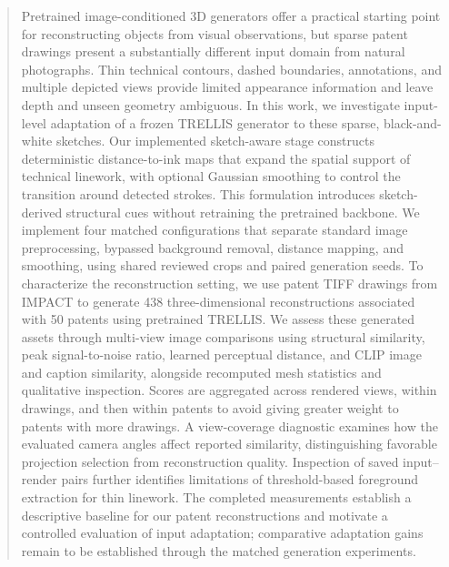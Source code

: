 \begin{abstract}
Pretrained image-conditioned 3D generators offer a practical starting point for
reconstructing objects from visual observations, but sparse patent drawings
present a substantially different input domain from natural photographs.
Thin technical contours, dashed boundaries, annotations, and multiple depicted
views provide limited appearance information and leave depth and unseen
geometry ambiguous. In this work, we investigate input-level adaptation of a
frozen TRELLIS generator to these sparse, black-and-white sketches. Our
implemented sketch-aware stage constructs deterministic distance-to-ink maps
that expand the spatial support of technical linework, with optional Gaussian
smoothing to control the transition around detected strokes. This formulation
introduces sketch-derived structural cues without retraining the pretrained
backbone. We implement four matched configurations that separate standard
image preprocessing, bypassed background removal, distance mapping, and
smoothing, using shared reviewed crops and paired generation seeds.
To characterize the reconstruction setting, we use patent TIFF drawings from
IMPACT to generate 438 three-dimensional reconstructions associated with
50 patents using pretrained TRELLIS. We assess these generated assets through
multi-view image comparisons using structural similarity, peak
signal-to-noise ratio, learned perceptual distance, and CLIP image and caption
similarity, alongside recomputed mesh statistics and qualitative inspection.
Scores are aggregated across rendered views, within drawings, and then within
patents to avoid giving greater weight to patents with more drawings. A
view-coverage diagnostic examines how the evaluated camera angles affect
reported similarity, distinguishing favorable projection selection from
reconstruction quality. Inspection of saved input--render pairs further
identifies limitations of threshold-based foreground extraction for thin
linework. The completed measurements establish a descriptive baseline for
our patent reconstructions and motivate a controlled evaluation of input
adaptation; comparative adaptation gains remain to be established through
the matched generation experiments.
\end{abstract}
